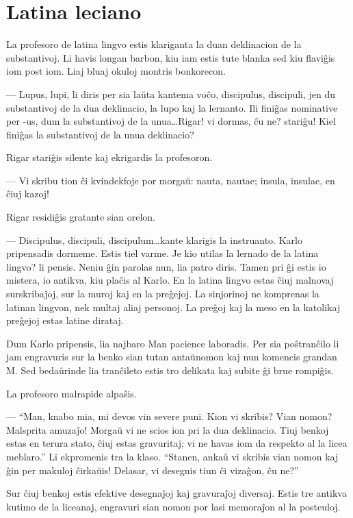 \chapter{Latina leciano}

La profesoro de latina lingvo estis klariganta la duan deklinacion de la substantivoj. Li havis longan barbon, kiu iam estis tute blanka sed kiu flaviĝis iom post iom. Liaj bluaj okuloj montris bonkorecon.

— Lupus, lupi, li diris per sia laŭta kantema voĉo, discipulus, discipuli, jen du substantivoj de la dua deklinacio, la lupo kaj la lernanto. Ili finiĝas nominative per -us, dum la substantivoj de la unua\ldots{}Rigar! vi dormas, ĉu ne? stariĝu! Kiel finiĝas la substantivoj de la unua deklinacio?

Rigar stariĝis silente kaj ekrigardis la profesoron.

— Vi skribu tion ĉi kvindekfoje por morgaŭ: nauta, nautae; insula, insulae, en ĉiuj kazoj!

Rigar residiĝis gratante sian orelon.

— Discipulus, discipuli, discipulum\ldots{}kante klarigis la instruanto. Karlo pripensadis dormeme. Estis tiel varme. Je kio utilas la lernado de la latina lingvo? li pensis. Neniu ĝin parolas nun, lia patro diris. Tamen pri ĝi estis io mistera, io antikva, kiu plaĉis al Karlo. En la latina lingvo estas ĉiuj malnovaj surskribaĵoj, sur la muroj kaj en la preĝejoj. La sinjorinoj ne komprenas la latinan lingvon, nek multaj aliaj personoj. La preĝoj kaj la meso en la katolikaj preĝejoj estas latine dirataj.

Dum Karlo pripensis, lia najbaro Man pacience laboradis. Per sia poŝtranĉilo li jam engravuris sur la benko sian tutan antaŭnomon kaj nun komencis grandan M. Sed bedaŭrinde lia tranĉileto estis tro delikata kaj subite ĝi brue rompiĝis.

La profesoro malrapide alpaŝis.

— ``Man, knabo mia, mi devos vin severe puni. Kion vi skribis? Vian nomon? Malsprita amuzaĵo! Morgaŭ vi ne scios ion pri la dua deklinacio. Tiuj benkoj estas en terura stato, ĉiuj estas gravuritaj; vi ne havas iom da respekto al la licea meblaro.'' Li ekpromenis tra la klaso. ``Stanen, ankaŭ vi skribis vian nomon kaj ĝin per makuloj ĉirkaŭis! Delasar, vi desegnis tiun ĉi vizaĝon, ĉu ne?''

Sur ĉiuj benkoj estis efektive desegnaĵoj kaj gravuraĵoj diversaj. Estis tre antikva kutimo de la liceanaj, engravuri sian nomon por lasi memoraĵon al la posteuloj.

